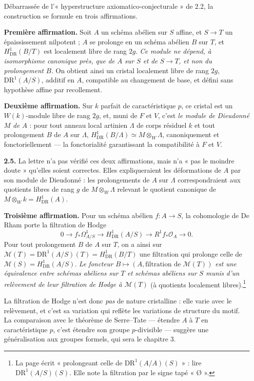 \documentclass[11pt,a4paper]{article}
\begin{document}
Débarrassée de l'« hyperstructure axiomatico-conjecturale » de 2.2, la
construction se formule en trois affirmations.

\textbf{Première affirmation.} Soit $A$ un schéma abélien sur $S$ affine, et
$S \to T$ un épaississement nilpotent ; $A$ se prolonge en un schéma abélien
$B$ sur $T$, et $H^1_{\mathrm{DR}}(B/T)$ est localement libre de rang $2g$.
\emph{Ce module ne dépend, à isomorphisme canonique près, que de $A$ sur $S$
et de $S \to T$, et non du prolongement $B$.} On obtient ainsi un cristal
localement libre de rang $2g$, $\mathrm{DR}^1(A/S)$, additif en $A$, compatible
au changement de base, et défini sans hypothèse affine par recollement.

\textbf{Deuxième affirmation.} Sur $k$ parfait de caractéristique $p$, ce
cristal est un $W(k)$-module libre de rang $2g$, et, muni de $F$ et $V$, c'est
\emph{le module de Dieudonné $M$ de $A$} : pour tout anneau local artinien
$\Lambda$ de corps résiduel $k$ et tout prolongement $B$ de $A$ sur $\Lambda$,
$H^1_{\mathrm{DR}}(B/\Lambda) \simeq M \otimes_W \Lambda$, canoniquement et
fonctoriellement — la fonctorialité garantissant la compatibilité à $F$ et
$V$.

\textbf{2.5.} La lettre n'a pas vérifié ces deux affirmations, mais n'a « pas
le moindre doute » qu'elles soient correctes. Elles expliqueraient les
déformations de $A$ par son module de Dieudonné : les prolongements de $A$ sur
$\Lambda$ correspondraient aux quotients libres de rang $g$ de
$M \otimes_W \Lambda$ relevant le quotient canonique de
$M \otimes_W k = H^1_{\mathrm{DR}}(A)$.

\textbf{Troisième affirmation.} Pour un schéma abélien $f : A \to S$, la
cohomologie de De Rham porte la filtration de Hodge
\[
  0 \longrightarrow f_*\Omega^1_{A/S} \longrightarrow H^1_{\mathrm{DR}}(A/S)
  \longrightarrow R^1f_*\mathcal{O}_A \longrightarrow 0 .
\]
Pour tout prolongement $B$ de $A$ sur $T$, on a ainsi sur
$\mathcal{M}(T) = \mathrm{DR}^1(A/S)(T) = H^1_{\mathrm{DR}}(B/T)$ une filtration
qui prolonge celle de $\mathcal{M}(S) = H^1_{\mathrm{DR}}(A/S)$. \emph{Le
foncteur $B \mapsto (A, \text{filtration de } \mathcal{M}(T))$ est une
équivalence entre schémas abéliens sur $T$ et schémas abéliens sur $S$ munis
d'un relèvement de leur filtration de Hodge à $\mathcal{M}(T)$} (à quotients
localement libres).\footnote{La page écrit « prolongeant celle de
$\mathrm{DR}^1(A/A)(S)$ » : lire $\mathrm{DR}^1(A/S)(S)$. Elle note la
filtration par le signe tapé « Ø ».}

La filtration de Hodge n'est donc \emph{pas} de nature cristalline : elle
varie avec le relèvement, et c'est sa variation qui reflète les variations de
structure du motif. La comparaison avec le théorème de Serre--Tate — étendre
$A$ à $T$ en caractéristique $p$, c'est étendre son groupe $p$-divisible —
suggère une généralisation aux groupes formels, qui sera le chapitre 3.
\end{document}
